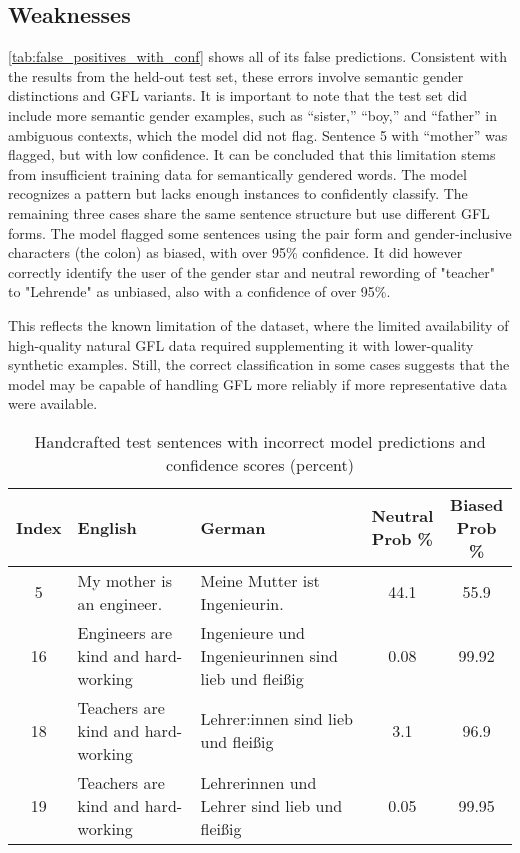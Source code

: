     \subsection{Weaknesses}
    \autoref{tab:false_positives_with_conf} shows all of its false predictions. Consistent with the results from the held-out test set, these errors involve semantic gender distinctions and GFL variants. It is important to note that the test set did include more semantic gender examples, such as “sister,” “boy,” and “father” in ambiguous contexts, which the model did not flag. Sentence 5 with “mother” was flagged, but with low confidence. It can be concluded that this limitation stems from insufficient training data for semantically gendered words. The model recognizes a pattern but lacks enough instances to confidently classify. The remaining three cases share the same sentence structure but use different GFL forms. The model flagged some sentences using the pair form and gender-inclusive characters (the colon) as biased, with over 95\% confidence. It did however correctly identify the user of the gender star and neutral rewording of "teacher" to "Lehrende" as unbiased, also with a confidence of over 95\%.
    
    This reflects the known limitation of the dataset, where the limited availability of high-quality natural GFL data required supplementing it with lower-quality synthetic examples. Still, the correct classification in some cases suggests that the model may be capable of handling GFL more reliably if more representative data were available.

    \vspace{0.8em}
        \begin{table}[ht]
        \centering
        \begin{tabular}{|c|p{5cm}|p{5cm}|c|c|}
        \hline
        \textbf{Index} & \textbf{English} & \textbf{German} & \makecell[c]{Neutral \\ Prob \%} & \makecell[c]{Biased \\ Prob \%} \\
        \hline
        5 & My mother is an engineer. & Meine Mutter ist Ingenieurin. & 44.1 & 55.9 \\
        16 & Engineers are kind and hard-working & Ingenieure und Ingenieurinnen sind lieb und fleißig & 0.08 & 99.92 \\
        18 & Teachers are kind and hard-working & Lehrer:innen sind lieb und fleißig & 3.1 & 96.9 \\
        19 & Teachers are kind and hard-working & Lehrerinnen und Lehrer sind lieb und fleißig & 0.05 & 99.95 \\
        \hline
        \end{tabular}
        \caption{Handcrafted test sentences with incorrect model predictions and confidence scores (percent)}
        \label{tab:false_positives_with_conf}
        \end{table}

